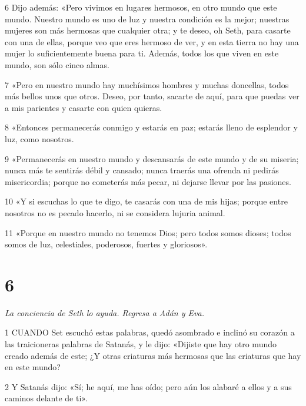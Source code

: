 \par 6 Dijo además: «Pero vivimos en lugares hermosos, en otro mundo que este mundo. Nuestro mundo es uno de luz y nuestra condición es la mejor; nuestras mujeres son más hermosas que cualquier otra; y te deseo, oh Seth, para casarte con una de ellas, porque veo que eres hermoso de ver, y en esta tierra no hay una mujer lo suficientemente buena para ti. Además, todos los que viven en este mundo, son sólo cinco almas.

\par 7 «Pero en nuestro mundo hay muchísimos hombres y muchas doncellas, todos más bellos unos que otros. Deseo, por tanto, sacarte de aquí, para que puedas ver a mis parientes y casarte con quien quieras.

\par 8 «Entonces permanecerás conmigo y estarás en paz; estarás lleno de esplendor y luz, como nosotros.

\par 9 «Permanecerás en nuestro mundo y descansarás de este mundo y de su miseria; nunca más te sentirás débil y cansado; nunca traerás una ofrenda ni pedirás misericordia; porque no cometerás más pecar, ni dejarse llevar por las pasiones.

\par 10 «Y si escuchas lo que te digo, te casarás con una de mis hijas; porque entre nosotros no es pecado hacerlo, ni se considera lujuria animal.

\par 11 «Porque en nuestro mundo no tenemos Dios; pero todos somos dioses; todos somos de luz, celestiales, poderosos, fuertes y gloriosos».

\chapter{6}

\par \textit{La conciencia de Seth lo ayuda. Regresa a Adán y Eva.}

\par 1 CUANDO Set escuchó estas palabras, quedó asombrado e inclinó su corazón a las traicioneras palabras de Satanás, y le dijo: «Dijiste que hay otro mundo creado además de este; ¿Y otras criaturas más hermosas que las criaturas que hay en este mundo?

\par 2 Y Satanás dijo: «Sí; he aquí, me has oído; pero aún los alabaré a ellos y a sus caminos delante de ti».


